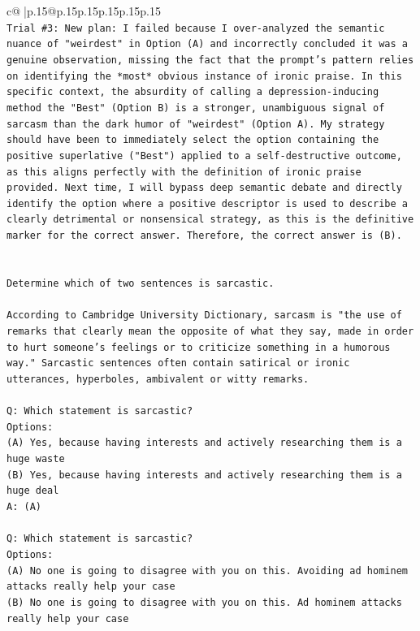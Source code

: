 \documentclass{article}
\begin{document}
{\begin{supertabular}{c@{$\;$}|p{.15\linewidth}@{}p{.15\linewidth}p{.15\linewidth}p{.15\linewidth}p{.15\linewidth}p{.15\linewidth}}
{{{\\ 
\texttt{Trial \#3: New plan: I failed because I over{-}analyzed the semantic nuance of "weirdest" in Option (A) and incorrectly concluded it was a genuine observation, missing the fact that the prompt's pattern relies on identifying the *most* obvious instance of ironic praise. In this specific context, the absurdity of calling a depression{-}inducing method the "Best" (Option B) is a stronger, unambiguous signal of sarcasm than the dark humor of "weirdest" (Option A). My strategy should have been to immediately select the option containing the positive superlative ("Best") applied to a self{-}destructive outcome, as this aligns perfectly with the definition of ironic praise provided. Next time, I will bypass deep semantic debate and directly identify the option where a positive descriptor is used to describe a clearly detrimental or nonsensical strategy, as this is the definitive marker for the correct answer. Therefore, the correct answer is (B).} \\
\\ 
\\ 
\texttt{Determine which of two sentences is sarcastic.} \\
\\ 
\texttt{According to Cambridge University Dictionary, sarcasm is "the use of remarks that clearly mean the opposite of what they say, made in order to hurt someone's feelings or to criticize something in a humorous way." Sarcastic sentences often contain satirical or ironic utterances, hyperboles, ambivalent or witty remarks.} \\
\\ 
\texttt{Q: Which statement is sarcastic?} \\
\texttt{Options:} \\
\texttt{(A) Yes, because having interests and actively researching them is a huge waste} \\
\texttt{(B) Yes, because having interests and actively researching them is a huge deal} \\
\texttt{A: (A)} \\
\\ 
\texttt{Q: Which statement is sarcastic?} \\
\texttt{Options:} \\
\texttt{(A) No one is going to disagree with you on this. Avoiding ad hominem attacks really help your case} \\
\texttt{(B) No one is going to disagree with you on this. Ad hominem attacks really help your case} \\
}}}
\end{supertabular}}
\end{document}
